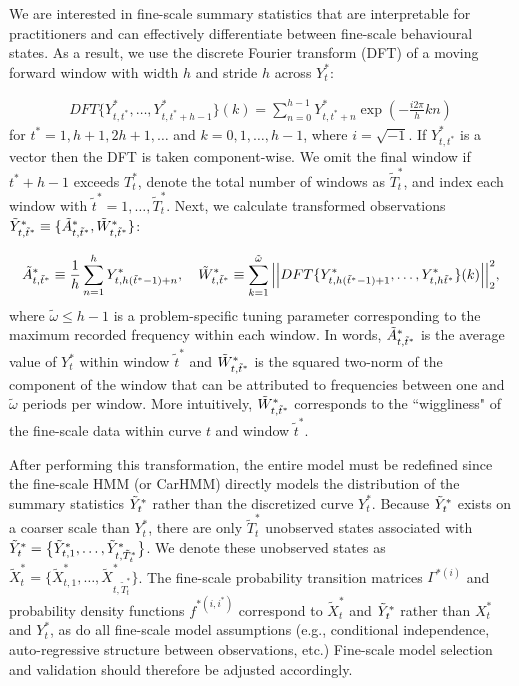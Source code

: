 We are interested in fine-scale summary statistics that are interpretable for practitioners and can effectively differentiate between fine-scale behavioural states. As a result, we use the discrete Fourier transform (DFT) of a moving forward window with width $h$ and stride $h$ across $Y^*_t$:

\begin{align}
    DFT\{Y^*_{t,t^*},\ldots, Y^*_{t,t^*+h-1}\}(k) = \sum_{n=0}^{h-1} Y^*_{t,t^*+n}\exp\left(-\frac{i 2\pi}{h} kn \right)
    \label{eq:DFTdef}
\end{align}
%
for $t^* = 1,h+1,2h+1,\ldots$ and $k = 0, 1, \ldots, h-1$, where $i = \sqrt{-1}$. If $Y^*_{t,t^*}$ is a vector then the DFT is taken component-wise. We omit the final window if $t^*+h-1$ exceeds $T^*_t$, denote the total number of windows as $\tilde T^*_t$, and index each window with $\tilde{t}^* = 1,\ldots,\tilde T^*_t$. Next, we calculate transformed observations $\tilde{Y}^*_{t,\tilde{t}^*} \equiv \{\tilde{A}^*_{t,\tilde{t}^*},\tilde{W}^*_{t,\tilde{t}^*}\}$:

\begin{equation}
    \label{eqn:z}
    \Zone_{t,\tilde{t}^*} \equiv \frac{1}{h}\sum_{n=1}^{h}Y^*_{t,h(\tilde{t}^*-1)+n}, \quad \Ztwo_{t,\tilde{t}^*} \equiv \sum_{k=1}^{\tilde{\omega}}\Big|\Big|DFT\{Y^*_{t,h(\tilde{t}^*-1)+1},\ldots, Y^*_{t,h\tilde{t}^*}\}(k)\Big|\Big|_2^2,
\end{equation}
%
where $\tilde{\omega} \leq h-1$ is a problem-specific tuning parameter corresponding to the maximum recorded frequency within each window. In words, $\tilde{A}^*_{t,\tilde{t}^*}$ is the average value of $Y^*_t$ within window $\tilde{t}^*$ and $\tilde{W}^*_{t,\tilde{t}^*}$ is the squared two-norm of the component of the window that can be attributed to frequencies between one and $\tilde{\omega}$ periods per window. More intuitively, $\tilde{W}^*_{t,\tilde{t}^*}$ corresponds to the ``wiggliness" of the fine-scale data within curve $t$ and window $\tilde{t}^*$.

After performing this transformation, the entire model must be redefined since the fine-scale HMM (or CarHMM) directly models the distribution of the summary statistics $\tilde{Y}^*_t$ rather than the discretized curve $Y^*_t$. Because $\tilde{Y}^*_t$ exists on a coarser scale than $Y^*_t$, there are only $\tilde{T}_t^*$ unobserved states associated with $\tilde{Y}^*_t = \big\{\tilde{Y}^*_{t,1},\ldots, \tilde{Y}^*_{t,\tilde{T}^*_t}\big\}$. We denote these unobserved states as $\tilde{X}^*_t = \big\{\tilde{X}^*_{t,1},\ldots, \tilde{X}^*_{t,\tilde{T}^*_t}\big\}$. The fine-scale probability transition matrices $\Gamma^{*(i)}$ and probability density functions $f^{*(i,i^*)}$ correspond to $\tilde{X}^*_t$ and $\tilde{Y}^*_t$ rather than $X^*_t$ and $Y^*_t$, as do all fine-scale model assumptions (e.g., conditional independence, auto-regressive structure between observations, etc.) Fine-scale model selection and validation should therefore be adjusted accordingly. %

